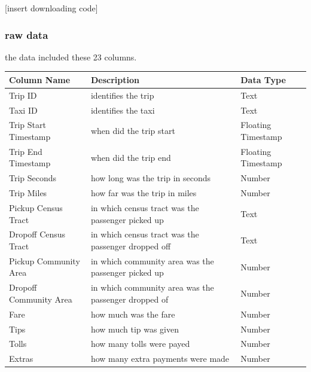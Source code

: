 \documentclass[
  letterpaper,
  DIV=11,
  numbers=noendperiod]{scrartcl}
\begin{document}
{[}insert downloading code{]}

\subsubsection{raw data}\label{raw-data}

the data included these 23 columns.

\begin{longtable}[]{@{}
  >{\raggedright\arraybackslash}p{}
  >{\raggedright\arraybackslash}p{}
  >{\raggedright\arraybackslash}p{}@{}}
\toprule\noalign{}
\begin{minipage}[b]{\linewidth}\raggedright
Column Name
\end{minipage} & \begin{minipage}[b]{\linewidth}\raggedright
Description
\end{minipage} & \begin{minipage}[b]{\linewidth}\raggedright
Data Type
\end{minipage} \\
\midrule\noalign{}
\endhead
\bottomrule\noalign{}
\endlastfoot
Trip ID & identifies the trip & Text \\
Taxi ID & identifies the taxi & Text \\
Trip Start Timestamp & when did the trip start & Floating Timestamp \\
Trip End Timestamp & when did the trip end & Floating Timestamp \\
Trip Seconds & how long was the trip in seconds & Number \\
Trip Miles & how far was the trip in miles & Number \\
Pickup Census Tract & in which census tract was the passenger picked up
& Text \\
Dropoff Census Tract & in which census tract was the passenger dropped
off & Text \\
Pickup Community Area & in which community area was the passenger picked
up & Number \\
Dropoff Community Area & in which community area was the passenger
dropped of & Number \\
Fare & how much was the fare & Number \\
Tips & how much tip was given & Number \\
Tolls & how many tolls were payed & Number \\
Extras & how many extra payments were made & Number \\

\end{longtable}
\end{document}
